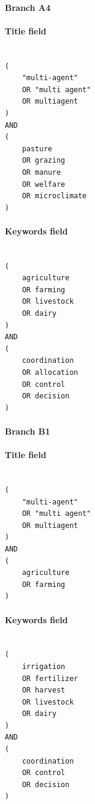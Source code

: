 \paragraph{Branch A4}

\paragraph{Title field}

\begin{lstlisting}

(
    "multi-agent"
    OR "multi agent"
    OR multiagent
)
AND
(
    pasture
    OR grazing
    OR manure
    OR welfare
    OR microclimate
)

\end{lstlisting}

\paragraph{Keywords field}

\begin{lstlisting}

(
    agriculture
    OR farming
    OR livestock
    OR dairy
)
AND
(
    coordination
    OR allocation
    OR control
    OR decision
)

\end{lstlisting}

\paragraph{Branch B1}

\paragraph{Title field}

\begin{lstlisting}

(
    "multi-agent"
    OR "multi agent"
    OR multiagent
)
AND
(
    agriculture
    OR farming
)

\end{lstlisting}

\paragraph{Keywords field}

\begin{lstlisting}

(
    irrigation
    OR fertilizer
    OR harvest
    OR livestock
    OR dairy
)
AND
(
    coordination
    OR control
    OR decision
)

\end{lstlisting}

